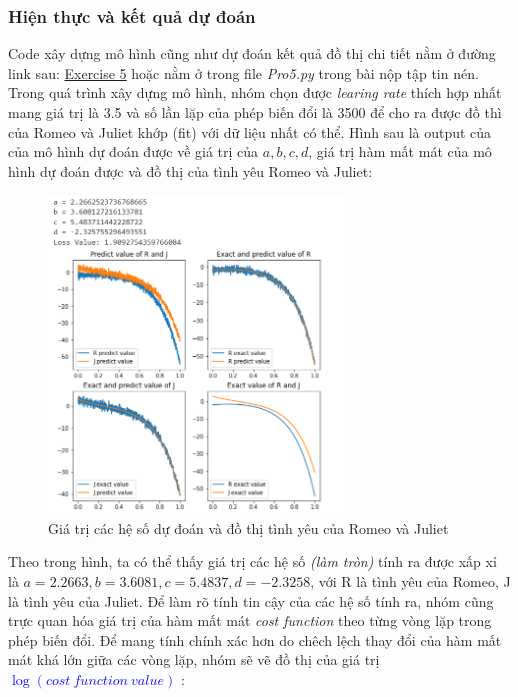\subsubsection{Hiện thực và kết quả dự đoán}
\par Code xây dựng mô hình cũng như dự đoán kết quả đồ thị chi tiết nằm ở đường link sau: \href{https://colab.research.google.com/drive/1m0rewA-U1Gx6qWTZARUoIuVBGPOEghOZ?fbclid=IwAR2-uZabt8mZ7-FcAazQpRfiNmZ_KHRS_BkDiebGcHR5oiK1Hybkb-wkDyE#scrollTo=_75wYhU5HtCe}{Exercise 5} hoặc nằm ở trong file \textit{Pro5.py} trong bài nộp tập tin nén. 
\newline
Trong quá trình xây dựng mô hình, nhóm chọn được \textit{learing rate} thích hợp nhất mang giá trị là 3.5 và số lần lặp của phép biến đổi là 3500 để cho ra được đồ thì của Romeo và Juliet khớp (fit) với dữ liệu nhất có thể. Hình sau là output của của mô hình dự đoán được về giá trị của $a, b, c, d$, giá trị hàm mất mát của mô hình dự đoán được và đồ thị của tình yêu Romeo và Juliet: 
\begin{figure}[H]
    \centering
    \includegraphics[width=0.7\textwidth]{image/bt5/Output Model.png}
    \caption{Giá trị các hệ số dự đoán và đồ thị tình yêu của Romeo và Juliet}
\end{figure}
Theo trong hình, ta có thể thấy giá trị các hệ số \textit{(làm tròn)} tính ra được xấp xỉ là $a = 2.2663, b = 3.6081, c = 5.4837, d = -2.3258$, với R là tình yêu của Romeo, J là tình yêu của Juliet. 
\newline
\newline
Để làm rõ tính tin cậy của các hệ số tính ra, nhóm cũng trực quan hóa giá trị của hàm mất mát \textit{cost function} theo từng vòng lặp trong phép biến đổi. Để mang tính chính xác hơn do chêch lệch thay đổi của hàm mất mát khá lớn giữa các vòng lặp, nhóm sẽ vẽ đồ thị của giá trị \textcolor{blue}{$\log (cost \: function \: value)$} : 
